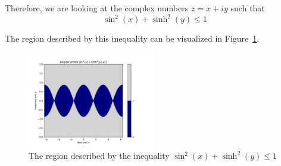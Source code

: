 		            Therefore, we are looking at the complex numbers $z
			            = x
			            + iy$ such that
		            \begin{equation}\sin^{2}(x)+\sinh^{2}(y) \leq
			            1\end{equation}

		            The region described by this inequality can be
		            visualized in Figure~\ref{fig:1a}.
		            \begin{figure}[h]
			            \centering

			            \includegraphics[width=0.5\textwidth]{sinz.pdf}
			            \caption{The region described by the
				            inequality
				            $\sin^{2}(x)+\sinh^{2}(y) \leq 1$}
			            \label{fig:1a}
		            \end{figure}